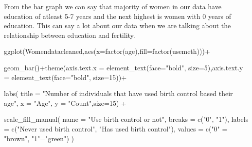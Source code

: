 \documentclass[
  letterpaper,
  DIV=11,
  numbers=noendperiod]{scrartcl}
\newenvironment{Shaded}{\begin{snugshade}}{\end{snugshade}}
\newcommand{\AttributeTok}[1]{\textcolor[rgb]{0.40,0.45,0.13}{#1}}
\newcommand{\DecValTok}[1]{\textcolor[rgb]{0.68,0.00,0.00}{#1}}
\newcommand{\FunctionTok}[1]{\textcolor[rgb]{0.28,0.35,0.67}{#1}}
\newcommand{\NormalTok}[1]{\textcolor[rgb]{0.00,0.23,0.31}{#1}}
\newcommand{\OtherTok}[1]{\textcolor[rgb]{0.00,0.23,0.31}{#1}}
\newcommand{\SpecialCharTok}[1]{\textcolor[rgb]{0.37,0.37,0.37}{#1}}
\newcommand{\StringTok}[1]{\textcolor[rgb]{0.13,0.47,0.30}{#1}}
\begin{document}
From the bar graph we can say that majority of women in our data have
education of atleast 5-7 years and the next highest is women with 0
years of education. This can say a lot about our data when we are
talking about the relationship between education and fertility.

\begin{Shaded}
\begin{Highlighting}[]
\FunctionTok{ggplot}\NormalTok{(Womendatacleaned,}\FunctionTok{aes}\NormalTok{(}\AttributeTok{x=}\FunctionTok{factor}\NormalTok{(age),}\AttributeTok{fill=}\FunctionTok{factor}\NormalTok{(usemeth)))}\SpecialCharTok{+}
  
\FunctionTok{geom\_bar}\NormalTok{()}\SpecialCharTok{+}\FunctionTok{theme}\NormalTok{(}\AttributeTok{axis.text.x =} \FunctionTok{element\_text}\NormalTok{(}\AttributeTok{face=}\StringTok{"bold"}\NormalTok{, }\AttributeTok{size=}\DecValTok{5}\NormalTok{),}\AttributeTok{axis.text.y =} \FunctionTok{element\_text}\NormalTok{(}\AttributeTok{face=}\StringTok{"bold"}\NormalTok{, }\AttributeTok{size=}\DecValTok{15}\NormalTok{))}\SpecialCharTok{+}
  
\FunctionTok{labs}\NormalTok{(}
    \AttributeTok{title =} \StringTok{"Number of individuals that have used birth control based their age"}\NormalTok{,}
    \AttributeTok{x =} \StringTok{"Age"}\NormalTok{,}
    \AttributeTok{y =} \StringTok{"Count"}\NormalTok{,}\AttributeTok{size=}\DecValTok{15}\NormalTok{) }\SpecialCharTok{+}
   
\FunctionTok{scale\_fill\_manual}\NormalTok{(}
    \AttributeTok{name =} \StringTok{"Use birth control or not"}\NormalTok{,}
    \AttributeTok{breaks =} \FunctionTok{c}\NormalTok{(}\StringTok{"0"}\NormalTok{, }\StringTok{"1"}\NormalTok{),}
    \AttributeTok{labels =} \FunctionTok{c}\NormalTok{(}\StringTok{"Never used birth control"}\NormalTok{, }\StringTok{"Has used birth control"}\NormalTok{),}
    \AttributeTok{values =} \FunctionTok{c}\NormalTok{(}\StringTok{"0"} \OtherTok{=} \StringTok{"brown"}\NormalTok{, }\StringTok{"1"}\OtherTok{=}\StringTok{"green"}\NormalTok{)}
\NormalTok{  )}
\end{Highlighting}
\end{Shaded}
\end{document}

